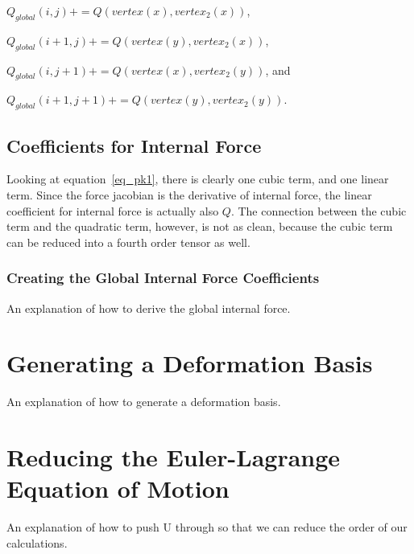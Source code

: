 \documentclass[twocolumn,10pt]{asme2ej}
\begin{document}
\begin{center}
$Q_{global}(i,j) += Q(vertex(x), vertex_2(x))$,

$Q_{global}(i + 1,j) += Q(vertex(y), vertex_2(x))$,

$Q_{global}(i ,j + 1) += Q(vertex(x), vertex_2(y))$, and

$Q_{global}(i + 1,j + 1) += Q(vertex(y), vertex_2(y))$.
\end{center}

\subsection{Coefficients for Internal Force}

Looking at equation~\ref{eq_pk1}, there is clearly one cubic term, and one linear term. Since the force jacobian is the derivative of internal force, the linear coefficient for internal force is actually also $Q$. The connection between the cubic term and the quadratic term, however, is not as clean, because the cubic term can be reduced into a fourth order tensor as well.


\subsubsection{Creating the Global Internal Force Coefficients}

An explanation of how to derive the global internal force.

\section{Generating a Deformation Basis}

An explanation of how to generate a deformation basis.

\section{Reducing the Euler-Lagrange Equation of Motion}

An explanation of how to push U through so that we can reduce the order of our calculations.

\end{document}
